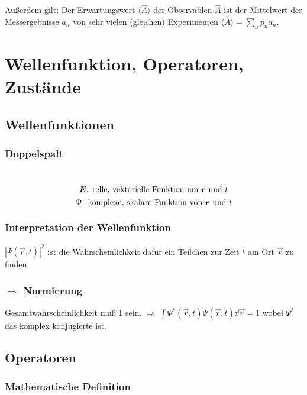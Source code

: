 Außerdem gilt: Der Erwartungswert $ \langle \hat{A} \rangle $ der Observablen $ \hat{A} $ ist der Mittelwert der Messergebnisse $ a_n $ von sehr vielen (gleichen) Experimenten $ \langle \hat{A} \rangle = \sum_n p_n a_n $.

\section{Wellenfunktion, Operatoren, Zustände}

\subsection{Wellenfunktionen}

\subsubsection{Doppelspalt}

\\
$$\bm{E}\textrm{: relle, vektorielle Funktion um }\bm{r}\textrm{ und }t$$
$$\Psi\textrm{: komplexe, skalare Funktion von } \bm{r} \textrm{ und }t$$

\subsubsection{Interpretation der Wellenfunktion}

$|\Psi(\vec{r},t)|^2$ ist die Wahrscheinlichkeit dafür ein Teilchen zur Zeit $t$ am Ort $\vec{r}$ zu finden.\\

\subsubsection{$\Rightarrow$ Normierung}

Gesamtwahrscheinlichkeit muß 1 sein. $\Rightarrow\ \int \Psi^*(\vec{r},t) \Psi(\vec{r},t) \dd \vec{r} = 1$ wobei $\Psi^*$ das komplex konjugierte ist.

\subsection{Operatoren}


\subsubsection{Mathematische Definition}

